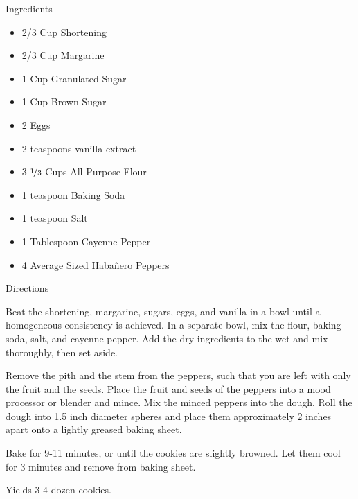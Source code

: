 Ingredients
\begin{itemize}
	\item 2/3 Cup Shortening
	\item 2/3 Cup Margarine
	\item 1 Cup Granulated Sugar
	\item 1 Cup Brown Sugar
	\item 2 Eggs
	\item 2 teaspoons vanilla extract
	\item 3 $\nicefrac{1}{3}$  Cups All-Purpose Flour
	\item 1 teaspoon Baking Soda
	\item 1 teaspoon Salt
	\item 1 Tablespoon Cayenne Pepper
	\item 4 Average Sized Haba{\~{n}}ero Peppers
\end{itemize}

\noindent
Directions
\newline

Beat the shortening, margarine, sugars, eggs, and vanilla in a bowl until a homogeneous consistency is achieved. In a separate bowl, mix the flour, baking soda, salt, and cayenne pepper. Add the dry ingredients to the wet and mix thoroughly, then set aside.

Remove the pith and the stem from the peppers, such that you are left with only the fruit and the seeds. Place the fruit and seeds of the peppers into a mood processor or blender and mince. Mix the minced peppers into the dough. Roll the dough into 1.5 inch diameter spheres and place them approximately 2 inches apart onto a lightly greased baking sheet.

Bake for 9-11 minutes, or until the cookies are slightly browned. Let them cool for 3 minutes and remove from baking sheet.

Yields 3-4 dozen cookies.

